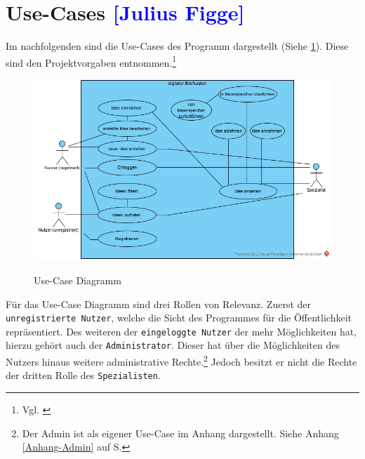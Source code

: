 

\section{Use-Cases  \textcolor{blue}{[Julius Figge]}}

Im nachfolgenden sind die Use-Cases des Programm dargestellt (Siehe \cref{fig:usecases}).
Diese sind den Projektvorgaben entnommen.\footnote{Vgl. \cite{Vorgaben2020}}

\begin{figure}[hbt]
    \label{usecase}
    \centering
    \begin{minipage}[t]{1\textwidth}
        \caption{Use-Case Diagramm}
        \includegraphics[width=1\textwidth]{img/createAnAccountWithSpamMailAccountYouSucker.png}\\
        \label{fig:usecases}
    \end{minipage}
\end{figure}

Für das Use-Case Diagramm sind drei Rollen von Relevanz.
Zuerst der \texttt{unregistrierte Nutzer}, welche die Sicht des Programmes für die Öffentlichkeit repräsentiert.
Des weiteren der \texttt{eingeloggte Nutzer} der mehr Möglichkeiten hat, hierzu gehört auch der \texttt{Administrator}.
Dieser hat über die Möglichkeiten des Nutzers hinaus weitere administrative Rechte.\footnote{Der Admin ist als eigener Use-Case im Anhang dargestellt. Siehe Anhang \ref{Anhang-Admin} auf S.\pageref{Anhang-Admin}}
Jedoch besitzt er nicht die Rechte der dritten Rolle des \texttt{Spezialisten}.\\

